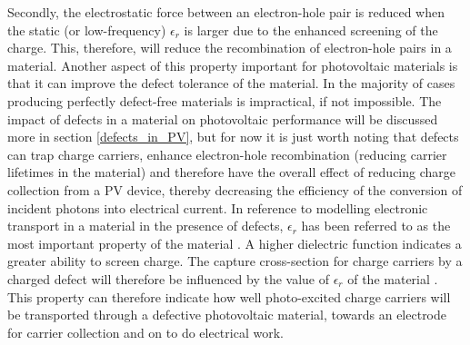 Secondly, the electrostatic force between an electron-hole pair is reduced when the static (or low-frequency) $\epsilon_r$ is larger \cite{dielectric_const1} due to the enhanced screening of the charge. This, therefore, will reduce the recombination of electron-hole pairs in a material. Another aspect of this property important for photovoltaic materials is that it can improve the defect tolerance of the material. In the majority of cases producing perfectly defect-free materials is impractical, if not impossible. The impact of defects in a material on photovoltaic performance will be discussed more in section \ref{defects_in_PV}, but for now it is just worth noting that defects can trap charge carriers, enhance electron-hole recombination (reducing carrier lifetimes in the material) and therefore have the overall effect of reducing charge collection from a PV device, thereby decreasing the efficiency of the conversion of incident photons into electrical current.
In reference to modelling electronic transport in a material in the presence of defects, $\epsilon_r$ has been referred to as the most important property of the material \cite{defect_tolerance}. A higher dielectric function indicates a greater ability to screen charge. The capture cross-section for charge carriers by a charged defect will therefore be influenced by the value of $\epsilon_r$ of the material \cite{defect_tolerance}. This property can therefore indicate how well photo-excited charge carriers will be transported through a defective photovoltaic material, towards an electrode for carrier collection and on to do electrical work.


